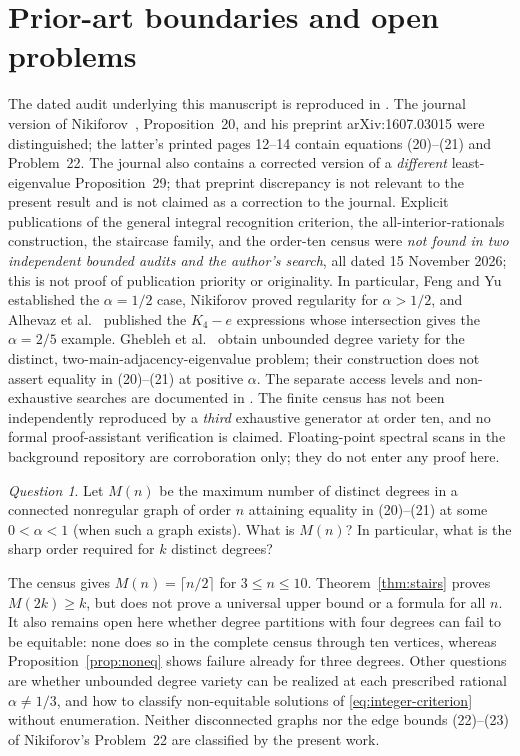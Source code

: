 \documentclass[11pt]{amsart}
\theoremstyle{remark}
\newtheorem{question}[theorem]{Question}
\begin{document}
\section{Prior-art boundaries and open problems}\label{sec:priority}
The dated audit underlying this manuscript is reproduced in
. The journal version of
Nikiforov~\cite{Nikiforov2017}, Proposition~20, and his
preprint arXiv:1607.03015 were distinguished; the latter's
printed pages 12--14 contain equations (20)--(21) and
Problem~22. The journal also contains a corrected version
of a \emph{different} least-eigenvalue Proposition~29; that
preprint discrepancy is not relevant to the present result
and is not claimed as a correction to the journal.
Explicit publications of the general integral recognition criterion,
the all-interior-rationals construction, the staircase family, and
the order-ten census were \emph{not found in two independent bounded
audits and the author's search}, all dated 15 November 2026; this
is not proof of publication priority or originality. In particular,
Feng and Yu~\cite[Lemma~2.3]{FengYu2009} established the
$\alpha=1/2$ case, Nikiforov proved regularity for $\alpha>1/2$,
and Alhevaz et al.~\cite[Remark~2.4]{AlhevazEtAl2023} published the
$K_4-e$ expressions whose intersection gives the $\alpha=2/5$
example. Ghebleh et al.~\cite{GheblehEtAl2025} obtain unbounded
degree variety for the distinct, two-main-adjacency-eigenvalue problem;
their construction does not assert equality in (20)--(21) at positive
$\alpha$. The separate access levels and non-exhaustive searches are
documented in .
The finite census has not been independently reproduced by
a \emph{third} exhaustive generator at order ten, and no
formal proof-assistant verification is claimed. Floating-point
spectral scans in the background repository are corroboration
only; they do not enter any proof here.

\begin{question}\label{ques:max}
Let $M(n)$ be the maximum number of distinct degrees in a
connected nonregular graph of order $n$ attaining equality
in (20)--(21) at some $0<\alpha<1$ (when such a graph
exists). What is $M(n)$? In particular, what is the
sharp order required for $k$ distinct degrees?
\end{question}
The census gives $M(n)=\lceil n/2\rceil$ for $3\leq n\leq10$.
Theorem~\ref{thm:stairs} proves $M(2k)\geq k$, but does not
prove a universal upper bound or a formula for all $n$.
It also remains open here whether degree partitions with
four degrees can fail to be equitable: none does so in the
complete census through ten vertices, whereas
Proposition~\ref{prop:noneq} shows failure already for
three degrees. Other questions are whether unbounded degree
variety can be realized at each prescribed rational
$\alpha\ne1/3$, and how to classify non-equitable solutions
of \eqref{eq:integer-criterion} without enumeration.
Neither disconnected graphs nor the edge bounds (22)--(23)
of Nikiforov's Problem~22 are classified by the present work.
\end{document}
